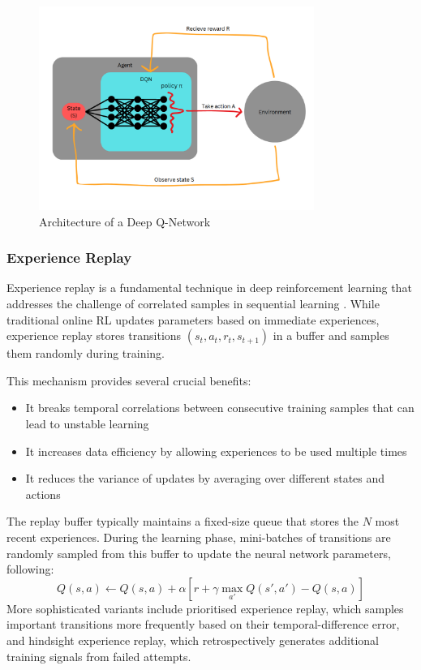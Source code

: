 \begin{figure}[H]
    \centering
    \includegraphics[width=0.8\textwidth]{figures/dqn_architecture}
    \caption{Architecture of a Deep Q-Network}
    \label{fig:dqn-architecture}
\end{figure}

\subsubsection{Experience Replay}

Experience replay is a fundamental technique in deep reinforcement learning that addresses the challenge of correlated samples in sequential learning \cite{scs2018exploration}. 
While traditional online RL updates parameters based on immediate experiences, experience replay stores transitions $(s_t, a_t, r_t, s_{t+1})$ in a buffer and samples them randomly during training.

This mechanism provides several crucial benefits:
\begin{itemize}
    \item It breaks temporal correlations between consecutive training samples that can lead to unstable learning
    \item It increases data efficiency by allowing experiences to be used multiple times
    \item It reduces the variance of updates by averaging over different states and actions
\end{itemize}
The replay buffer typically maintains a fixed-size queue that stores the $N$ most recent experiences. 
During the learning phase, mini-batches of transitions are randomly sampled from this buffer to update the neural network parameters, following:
$$Q(s,a) \leftarrow Q(s,a) + \alpha[r + \gamma\max_{a'}Q(s',a') - Q(s,a)]$$
More sophisticated variants include prioritised experience replay, which samples important transitions more frequently based on their temporal-difference error, 
and hindsight experience replay, which retrospectively generates additional training signals from failed attempts.


